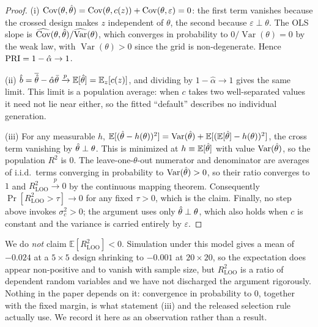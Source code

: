 \documentclass[10pt,twocolumn,letterpaper]{article}
\begin{document}
\begin{proof}
(i) $\operatorname{Cov}(\theta,\hat{\theta})=\operatorname{Cov}(\theta,c(z))
+\operatorname{Cov}(\theta,\varepsilon)=0$: the first term vanishes because
the crossed design makes $z$ independent of $\theta$, the second because
$\varepsilon\perp\theta$. The OLS slope is
$\widehat{\operatorname{Cov}}(\theta,\hat{\theta})/\widehat{\operatorname{Var}}(\theta)$,
which converges in probability to $0/\operatorname{Var}(\theta)=0$ by the
weak law, with $\operatorname{Var}(\theta)>0$ since the grid is
non-degenerate. Hence $\mathrm{PRI}=1-\hat\alpha\to1$.

(ii) $\hat b=\overline{\hat{\theta}}-\hat\alpha\bar\theta\xrightarrow{p}
\mathbb{E}[\hat{\theta}]=\mathbb{E}_z[c(z)]$, and dividing by $1-\hat\alpha\to1$
gives the same limit. This limit is a population average: when $c$ takes two
well-separated values it need not lie near either, so the fitted ``default''
describes no individual generation.

(iii) For any measurable $h$,
$\mathbb{E}[(\hat{\theta}-h(\theta))^2]
=\operatorname{Var}(\hat{\theta})
+\mathbb{E}[(\mathbb{E}[\hat{\theta}]-h(\theta))^2]$,
the cross term vanishing by $\hat{\theta}\perp\theta$. This is minimized at
$h\equiv\mathbb{E}[\hat{\theta}]$ with value $\operatorname{Var}(\hat{\theta})$, so the
population $R^2$ is $0$. The leave-one-$\theta$-out numerator and denominator
are averages of i.i.d.\ terms converging in probability to
$\operatorname{Var}(\hat{\theta})>0$, so their ratio converges to $1$ and
$R^2_{\mathrm{LOO}}\xrightarrow{p}0$ by the continuous mapping theorem.
Consequently $\Pr[R^2_{\mathrm{LOO}}>\tau]\to0$ for any fixed $\tau>0$, which
is the claim. Finally, no step above invokes $\sigma_c^2>0$; the argument
uses only $\hat{\theta}\perp\theta$, which also holds when $c$ is constant and the
variance is carried entirely by $\varepsilon$.
\end{proof}

\begin{remark}
We do \emph{not} claim $\mathbb{E}[R^2_{\mathrm{LOO}}]<0$. Simulation under
this model gives a mean of $-0.024$ at a $5\times5$ design shrinking to
$-0.001$ at $20\times20$, so the expectation does appear non-positive and to
vanish with sample size, but $R^2_{\mathrm{LOO}}$ is a ratio of dependent
random variables and we have not discharged the argument rigorously. Nothing
in the paper depends on it: convergence in probability to $0$, together with
the fixed margin, is what statement (iii) and the released selection rule
actually use. We record it here as an observation rather than a result.
\end{remark}
\end{document}
